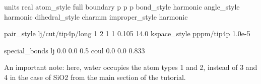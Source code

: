 \begin{lcverbatim}
units real
atom_style full
boundary p p p
bond_style harmonic
angle_style harmonic
dihedral_style charmm
improper_style harmonic

pair_style lj/cut/tip4p/long 1 2 1 1 0.105 14.0
kspace_style pppm/tip4p 1.0e-5

special_bonds lj 0.0 0.0 0.5 coul 0.0 0.0 0.833
\end{lcverbatim}

\noindent An important note: here, water occupies the atom types 1 and 2,
instead of 3 and 4 in the case of SiO2 from the main section 
of the tutorial.

